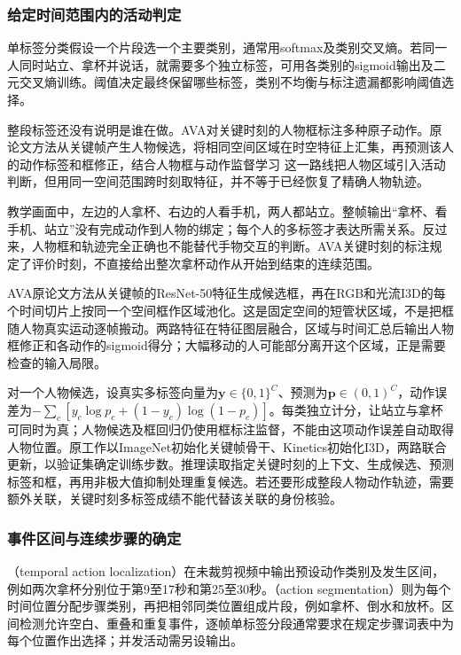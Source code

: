 \subsubsection{给定时间范围内的活动判定}
\label{sec:vision-video-clip-label}

单标签分类假设一个片段选一个主要类别，通常用softmax及类别交叉熵。若同一人同时站立、拿杯并说话，就需要多个独立标签，可用各类别的sigmoid输出及二元交叉熵训练。阈值决定最终保留哪些标签，类别不均衡与标注遗漏都影响阈值选择。

整段标签还没有说明是谁在做。AVA对关键时刻的人物框标注多种原子动作。原论文方法从关键帧产生人物候选，将相同空间区域在时空特征上汇集，再预测该人的动作标签和框修正，结合人物框与动作监督学习 这一路线把人物区域引入活动判断，但用同一空间范围跨时刻取特征，并不等于已经恢复了精确人物轨迹。

教学画面中，左边的人拿杯、右边的人看手机，两人都站立。整帧输出“拿杯、看手机、站立”没有完成动作到人物的绑定；每个人的多标签才表达所需关系。反过来，人物框和轨迹完全正确也不能替代手物交互的判断。AVA关键时刻的标注规定了评价时刻，不直接给出整次拿杯动作从开始到结束的连续范围。

AVA原论文方法从关键帧的ResNet-50特征生成候选框，再在RGB和光流I3D的每个时间切片上按同一个空间框作区域池化。这是固定空间的短管状区域，不是把框随人物真实运动逐帧搬动。两路特征在特征图层融合，区域与时间汇总后输出人物框修正和各动作的sigmoid得分；大幅移动的人可能部分离开这个区域，正是需要检查的输入局限。

对一个人物候选，设真实多标签向量为$\bm{y}\in\{0,1\}^{C}$、预测为$\bm{p}\in(0,1)^C$，动作误差为$-\sum_c[y_c\log p_c+(1-y_c)\log(1-p_c)]$。每类独立计分，让站立与拿杯可同时为真；人物候选及框回归仍使用框标注监督，不能由这项动作误差自动取得人物位置。原工作以ImageNet初始化关键帧骨干、Kinetics初始化I3D，两路联合更新，以验证集确定训练步数。推理读取指定关键时刻的上下文、生成候选、预测标签和框，再用非极大值抑制处理重复候选。若还要形成整段人物动作轨迹，需要额外关联，关键时刻多标签成绩不能代替该关联的身份核验。

\subsubsection{事件区间与连续步骤的确定}
\label{sec:vision-video-temporal-boundaries}

（temporal action localization）在未裁剪视频中输出预设动作类别及发生区间，例如两次拿杯分别位于第9至17秒和第25至30秒。（action segmentation）则为每个时间位置分配步骤类别，再把相邻同类位置组成片段，例如拿杯、倒水和放杯。区间检测允许空白、重叠和重复事件，逐帧单标签分段通常要求在规定步骤词表中为每个位置作出选择；并发活动需另设输出。


